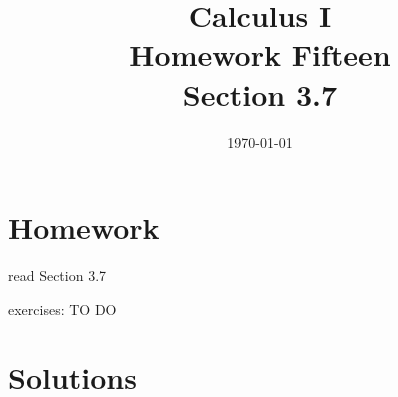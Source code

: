 \documentclass[letterpaper, landscape]{exam}
\title{Calculus I \\ Homework Fifteen \\ Section 3.7}
\author{}
\date{\today}
\begin{document}
  \maketitle

  \section{Homework}
    \begin{itemize*}
      \item read Section 3.7
      \item exercises: TO DO
    \end{itemize*}

  \ifprintanswers

  \section{Solutions}
\end{document}
